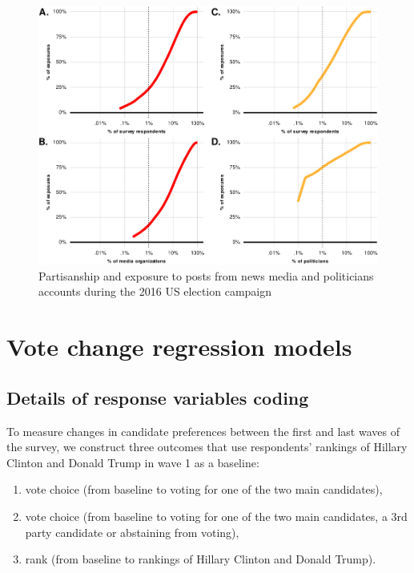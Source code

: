 \documentclass[
  12pt,
]{article}
\begin{document}
\begin{figure}
\centering
\includegraphics{Appendix_files/figure-latex/Figure-D6-1.pdf}
\caption{\label{fig:Figure-D6}Partisanship and exposure to posts from news media and politicians accounts during the 2016 US election campaign}
\end{figure}

\clearpage

\hypertarget{vote-change-regression-models}{%
\section{Vote change regression models}\label{vote-change-regression-models}}

\hypertarget{details-of-response-variables-coding}{%
\subsection{Details of response variables coding}\label{details-of-response-variables-coding}}

To measure changes in candidate preferences between the first and last waves of the survey, we construct three outcomes that use respondents' rankings of Hillary Clinton and Donald Trump in wave 1 as a baseline:

\begin{enumerate}[label=(\arabic*)]
  \item vote choice (from baseline to voting for one of the two main candidates),
  \item vote choice (from baseline to voting for one of the two main candidates, a 3rd party candidate or abstaining from voting),
  \item rank (from baseline to rankings of Hillary Clinton and Donald Trump).
\end{enumerate}
\end{document}
